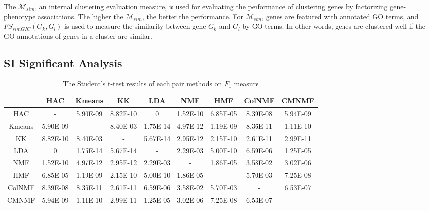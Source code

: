 \documentclass{article}
\begin{document}
The $\mathcal{M}_{sim}$, an internal clustering evaluation measure, is used for evaluating the performance of clustering genes by factorizing gene-phenotype associations. The higher the $\mathcal{M}_{sim}$, the better the performance. For $\mathcal{M}_{sim}$, genes are featured with annotated GO terms, and $FS_{simGIC}(G_k,G_l)$ \cite{Teng2013} is used to measure the similarity between gene $G_k$ and $G_l$ by GO terms. In other words, genes are clustered well if the GO annotations of genes in a cluster are similar.
\subsection*{\textbf{SI Significant Analysis}}
\begin{table}[!h]
\centering
\caption{The Student's t-test results of each pair methods on $F_1$ measure}\label{F1}
\begin{tabular}{c|cccccccc}
\hline
&HAC &Kmeans& KK&LDA&NMF&HMF&ColNMF&CMNMF\\
\hline
HAC&- & 5.90E-09&8.82E-10&0&1.52E-10&6.85E-05&8.39E-08&5.94E-09\\
Kmeans&5.90E-09& -&8.40E-03&1.75E-14&4.97E-12&1.19E-09&8.36E-11&1.11E-10\\
KK&8.82E-10& 8.40E-03&-&5.67E-14&2.95E-12&2.15E-10&2.61E-11&2.99E-11\\
LDA&0& 1.75E-14&5.67E-14&-&2.29E-03&5.00E-10&6.59E-06&1.25E-05\\
NMF&1.52E-10& 4.97E-12&2.95E-12&2.29E-03&-&1.86E-05&3.58E-02&3.02E-06\\
HMF&6.85E-05& 1.19E-09&2.15E-10&5.00E-10&1.86E-05&-&5.70E-03&7.25E-08\\
ColNMF &8.39E-08& 8.36E-11&2.61E-11&6.59E-06&3.58E-02&5.70E-03&-&6.53E-07\\
CMNMF &5.94E-09&1.11E-10&2.99E-11&1.25E-05&3.02E-06&7.25E-08&6.53E-07&-\\
\hline
\end{tabular}
\end{table}
\end{document}
